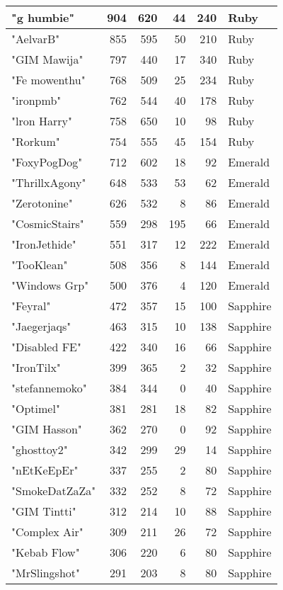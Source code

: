 \documentclass{article}
\begin{document}
\begin{table}[htbp]
\begin{tabular}{|l|r|r|r|r|l|}
"g humbie" & 904 & 620 & 44 & 240 & Ruby \\ \hline
"AelvarB" & 855 & 595 & 50 & 210 & Ruby \\ \hline
"GIM Mawija" & 797 & 440 & 17 & 340 & Ruby \\ \hline
"Fe mowenthu" & 768 & 509 & 25 & 234 & Ruby \\ \hline
"ironpmb" & 762 & 544 & 40 & 178 & Ruby \\ \hline
"lron Harry" & 758 & 650 & 10 & 98 & Ruby \\ \hline
"Rorkum" & 754 & 555 & 45 & 154 & Ruby \\ \hline
"FoxyPogDog" & 712 & 602 & 18 & 92 & Emerald \\ \hline
"ThrillxAgony" & 648 & 533 & 53 & 62 & Emerald \\ \hline
"Zerotonine" & 626 & 532 & 8 & 86 & Emerald \\ \hline
"CosmicStairs" & 559 & 298 & 195 & 66 & Emerald \\ \hline
"IronJethide" & 551 & 317 & 12 & 222 & Emerald \\ \hline
"TooKlean" & 508 & 356 & 8 & 144 & Emerald \\ \hline
"Windows Grp" & 500 & 376 & 4 & 120 & Emerald \\ \hline
"Feyral" & 472 & 357 & 15 & 100 & Sapphire \\ \hline
"Jaegerjaqs" & 463 & 315 & 10 & 138 & Sapphire \\ \hline
"Disabled FE" & 422 & 340 & 16 & 66 & Sapphire \\ \hline
"IronTilx" & 399 & 365 & 2 & 32 & Sapphire \\ \hline
"stefannemoko" & 384 & 344 & 0 & 40 & Sapphire \\ \hline
"Optimel" & 381 & 281 & 18 & 82 & Sapphire \\ \hline
"GIM Hasson" & 362 & 270 & 0 & 92 & Sapphire \\ \hline
"ghosttoy2" & 342 & 299 & 29 & 14 & Sapphire \\ \hline
"nEtKeEpEr" & 337 & 255 & 2 & 80 & Sapphire \\ \hline
"SmokeDatZaZa" & 332 & 252 & 8 & 72 & Sapphire \\ \hline
"GIM Tintti" & 312 & 214 & 10 & 88 & Sapphire \\ \hline
"Complex Air" & 309 & 211 & 26 & 72 & Sapphire \\ \hline
"Kebab Flow" & 306 & 220 & 6 & 80 & Sapphire \\ \hline
"MrSlingshot" & 291 & 203 & 8 & 80 & Sapphire \\ \hline

\end{tabular}
\end{table}
\end{document}
